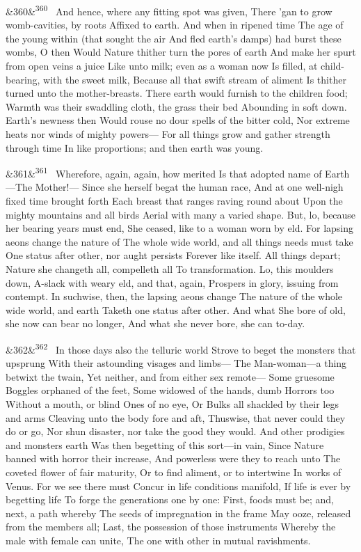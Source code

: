 \documentclass[12pt]{article}
\newcommand{\para}[1][]{\par\noindent\ifx&#1&\else\textsuperscript{\footnotesize #1}~\fi}
\begin{document}
\para[360] And hence, where any fitting spot was given, There 'gan to grow womb-cavities, by roots Affixed to earth. And when in ripened time The age of the young within (that sought the air And fled earth's damps) had burst these wombs, O then Would Nature thither turn the pores of earth And make her spurt from open veins a juice Like unto milk; even as a woman now Is filled, at child-bearing, with the sweet milk, Because all that swift stream of aliment Is thither turned unto the mother-breasts. There earth would furnish to the children food; Warmth was their swaddling cloth, the grass their bed Abounding in soft down. Earth's newness then Would rouse no dour spells of the bitter cold, Nor extreme heats nor winds of mighty powers--- For all things grow and gather strength through time In like proportions; and then earth was young.

\para[361] Wherefore, again, again, how merited Is that adopted name of Earth---The Mother!--- Since she herself begat the human race, And at one well-nigh fixed time brought forth Each breast that ranges raving round about Upon the mighty mountains and all birds Aerial with many a varied shape. But, lo, because her bearing years must end, She ceased, like to a woman worn by eld. For lapsing aeons change the nature of The whole wide world, and all things needs must take One status after other, nor aught persists Forever like itself. All things depart; Nature she changeth all, compelleth all To transformation. Lo, this moulders down, A-slack with weary eld, and that, again, Prospers in glory, issuing from contempt. In suchwise, then, the lapsing aeons change The nature of the whole wide world, and earth Taketh one status after other. And what She bore of old, she now can bear no longer, And what she never bore, she can to-day.

\para[362] In those days also the telluric world Strove to beget the monsters that upsprung With their astounding visages and limbs--- The Man-woman---a thing betwixt the twain, Yet neither, and from either sex remote--- Some gruesome Boggles orphaned of the feet, Some widowed of the hands, dumb Horrors too Without a mouth, or blind Ones of no eye, Or Bulks all shackled by their legs and arms Cleaving unto the body fore and aft, Thuswise, that never could they do or go, Nor shun disaster, nor take the good they would. And other prodigies and monsters earth Was then begetting of this sort---in vain, Since Nature banned with horror their increase, And powerless were they to reach unto The coveted flower of fair maturity, Or to find aliment, or to intertwine In works of Venus. For we see there must Concur in life conditions manifold, If life is ever by begetting life To forge the generations one by one: First, foods must be; and, next, a path whereby The seeds of impregnation in the frame May ooze, released from the members all; Last, the possession of those instruments Whereby the male with female can unite, The one with other in mutual ravishments.
\end{document}
